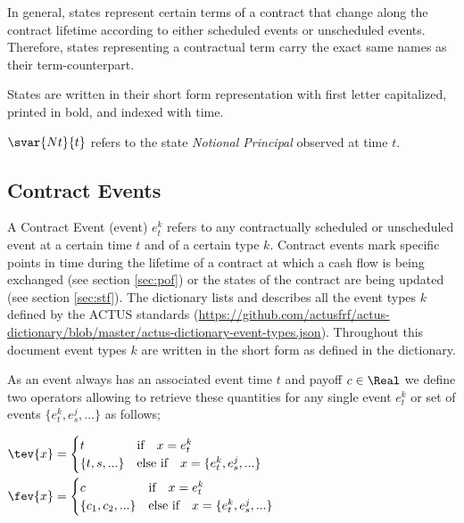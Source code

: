 In general, states represent certain terms of a contract that change along the contract lifetime according to either scheduled events or unscheduled events. Therefore, states representing a contractual term carry the exact same names as their term-counterpart.

States are written in their short form representation with first letter capitalized, printed in bold, and indexed with time.

\begin{example}
$\svar{Nt}{t}$ refers to the state \textit{Notional Principal} observed at time $t$.
\end{example}


\subsection{Contract Events}\label{sec:events}

A Contract Event (event) $e_t^k$ refers to any contractually scheduled or unscheduled event at a certain time $t$ and of a certain type $k$. Contract events mark specific points in time during the lifetime of a contract at which a cash flow is being exchanged (see section \ref{sec:pof}) or the states of the contract are being updated (see section \ref{sec:stf}). The dictionary lists and describes all the event types $k$ defined by the ACTUS standards (\url{https://github.com/actusfrf/actus-dictionary/blob/master/actus-dictionary-event-types.json}). Throughout this document event types $k$ are written in the short form as defined in the dictionary.

As an event always has an associated event time $t$ and payoff $c\in\Real$ we define two operators allowing to retrieve these quantities for any single event $e_t^k$ or set of events $\{e_t^k,e_s^j, ...\}$ as follows;

{$\begin{aligned}
	\tev{x} &= \begin{cases} t & \text{if}\quad x=e_t^k \\
				\{t,s,...\} & \text{else if}\quad x=\{e_t^k,e_s^j,...\} \end{cases} \\
	\fev{x} &= \begin{cases} c & \text{if}\quad x=e_t^k \\
				\{c_1, c_2, ...\} & \text{else if}\quad x=\{e_t^k,e_s^j,...\} \end{cases}
\end{aligned}$}

